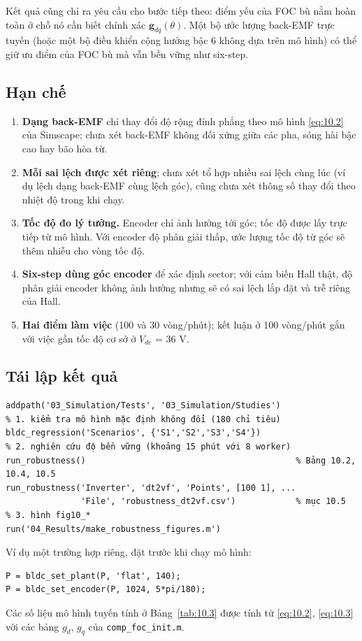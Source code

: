 Kết quả cũng chỉ ra yêu cầu cho bước tiếp theo: điểm yếu của FOC bù nằm hoàn toàn ở chỗ nó cần biết chính xác $\mathbf{g}_{dq}(\theta)$. Một bộ ước lượng back-EMF trực tuyến (hoặc một bộ điều khiển cộng hưởng bậc 6 không dựa trên mô hình) có thể giữ ưu điểm của FOC bù mà vẫn bền vững như six-step.

\subsection{Hạn chế}\label{sec:10.7}

\begin{enumerate}[leftmargin=*]
\item \textbf{Dạng back-EMF} chỉ thay đổi độ rộng đỉnh phẳng theo mô hình \eqref{eq:10.2} của Simscape; chưa xét back-EMF không đối xứng giữa các pha, sóng hài bậc cao hay bão hòa từ.
\item \textbf{Mỗi sai lệch được xét riêng}; chưa xét tổ hợp nhiều sai lệch cùng lúc (ví dụ lệch dạng back-EMF cùng lệch góc), cũng chưa xét thông số thay đổi theo nhiệt độ trong khi chạy.
\item \textbf{Tốc độ đo lý tưởng.} Encoder chỉ ảnh hưởng tới góc; tốc độ được lấy trực tiếp từ mô hình. Với encoder độ phân giải thấp, ước lượng tốc độ từ góc sẽ thêm nhiễu cho vòng tốc độ.
\item \textbf{Six-step dùng góc encoder} để xác định sector; với cảm biến Hall thật, độ phân giải encoder không ảnh hưởng nhưng sẽ có sai lệch lắp đặt và trễ riêng của Hall.
\item \textbf{Hai điểm làm việc} (100 và 30 vòng/phút); kết luận ở 100 vòng/phút gắn với việc gần tốc độ cơ sở ở $V_{dc}$ = 36 V.
\end{enumerate}

\subsection{Tái lập kết quả}\label{sec:10.8}

\begin{Verbatim}
addpath('03_Simulation/Tests', '03_Simulation/Studies')
% 1. kiểm tra mô hình mặc định không đổi (180 chỉ tiêu)
bldc_regression('Scenarios', {'S1','S2','S3','S4'})
% 2. nghiên cứu độ bền vững (khoảng 15 phút với 8 worker)
run_robustness()                                          % Bảng 10.2, 10.4, 10.5
run_robustness('Inverter', 'dt2vf', 'Points', [100 1], ...
               'File', 'robustness_dt2vf.csv')            % mục 10.5
% 3. hình fig10_*
run('04_Results/make_robustness_figures.m')
\end{Verbatim}

Ví dụ một trường hợp riêng, đặt trước khi chạy mô hình:

\begin{Verbatim}
P = bldc_set_plant(P, 'flat', 140);
P = bldc_set_encoder(P, 1024, 5*pi/180);
\end{Verbatim}

\noindent Các số liệu mô hình tuyến tính ở Bảng~\ref{tab:10.3} được tính từ \eqref{eq:10.2}, \eqref{eq:10.3} với các bảng $g_d$, $g_q$ của \texttt{comp\_foc\_init.m}.


